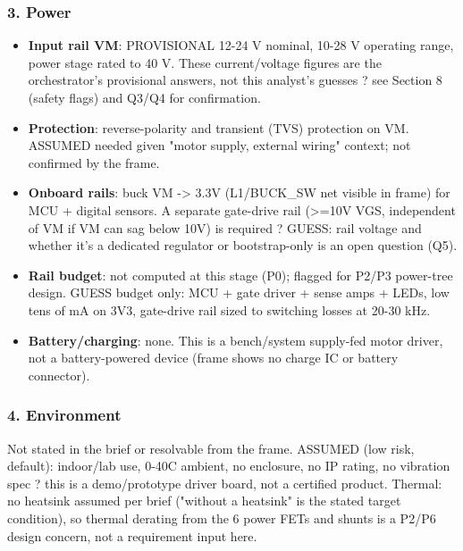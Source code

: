 \documentclass[11pt,a4paper]{article}
\begin{document}
\subsubsection*{3. Power}
\begin{itemize}
\item \textbf{Input rail VM}: PROVISIONAL 12-24 V nominal, 10-28 V operating range,
power stage rated to 40 V. These current/voltage figures are the
orchestrator's provisional answers, not this analyst's guesses ? see
Section 8 (safety flags) and Q3/Q4 for confirmation.
\item \textbf{Protection}: reverse-polarity and transient (TVS) protection on VM.
ASSUMED needed given "motor supply, external wiring" context; not
confirmed by the frame.
\item \textbf{Onboard rails}: buck VM -\textgreater{} 3.3V (L1/BUCK\_SW net visible in frame) for
MCU + digital sensors. A separate gate-drive rail (\textgreater{}=10V VGS, independent
of VM if VM can sag below 10V) is required ? GUESS: rail voltage and
whether it's a dedicated regulator or bootstrap-only is an open question
(Q5).
\item \textbf{Rail budget}: not computed at this stage (P0); flagged for P2/P3
power-tree design. GUESS budget only: MCU + gate driver + sense amps +
LEDs, low tens of mA on 3V3, gate-drive rail sized to switching losses
at 20-30 kHz.
\item \textbf{Battery/charging}: none. This is a bench/system supply-fed motor
driver, not a battery-powered device (frame shows no charge IC or
battery connector).
\end{itemize}
\subsubsection*{4. Environment}
Not stated in the brief or resolvable from the frame. ASSUMED (low risk, default): indoor/lab use, 0-40C ambient, no enclosure, no IP rating, no vibration spec ? this is a demo/prototype driver board, not a certified product. Thermal: no heatsink assumed per brief ("without a heatsink" is the stated target condition), so thermal derating from the 6 power FETs and shunts is a P2/P6 design concern, not a requirement input here.
\end{document}
